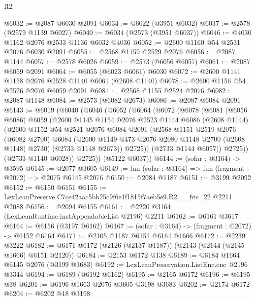 \begin{lexlean}{R2}
\begin{coremodule}
@6032 := @2087 @6030 @2091
@6034 := @6022 (@3951 @6032)
@6037 := @2578 (@2579 @1139 @6027)
@6040 := @6034 (@2573 (@3951 @6037))
@6046 := @4030 @1162 @2076 @2533 @1136 @6032 @4036
@6052 := @2600 @1160 @54 @2531 @2076 @6030 @2091
@6055 := @2568 @1159 @2529 @2076
@6056 := @2087 @1144
@6057 := @2578 @6026
@6059 := @2573 (@6056 @6057)
@6061 := @2087 @6059 @2091
@6064 := @6055 (@6023 @6061) @6030
@6072 := @2600 @1141 @1158 @2076 @2528 @1140 @6061 (@2608 @1140)
@6078 := @2600 @1156 @54 @2526 @2076 @6059 @2091
@6081 := @2568 @1155 @2524 @2076
@6082 := @2087 @1148
@6084 := @2573 (@6082 @2673)
@6086 := @2087 @6084 @2091
@6143 := @6019
    (@6040
      (@6046
        (@6052
          (@6064
            (@6072
              (@6078
                (@6081
                  (@6056 @6086)
                  @6059
                  (@2600
                    @1145
                    @1154
                    @2076
                    @2523
                    @1144
                    @6086
                    (@2608 @1144)
                    (@2600
                      @1152
                      @54
                      @2521
                      @2076
                      @6084
                      @2091
                      (@2568
                        @1151
                        @2519
                        @2076
                        (@6082 @2700)
                        @6084
                        (@2600 @1149 @473 @2076 @2080 @1148 @2700 (@2608 @1148) @2730)
                        (@2733 @1148 @2673))
                      @2725))
                  (@2733 @1144 @6057))
                @2725))
            (@2733 @1140 @6028))
          @2725))
      (@5122 @6037))
@6144 := (sofar : @3164) -> @3595
@6145 := @2077 @3605
@6149 := fun (sofar : @3164) => fun (fragment : @2072) => @2075 @6145 @2076
@6150 := @2084 @1187
@6151 := @3199 @2092
@6152 := @6150 @6151
@6155 := LexLeanPreserve.C7ce42aac5bb25c9f6e1f1815f7aeb5e9.R2.__fits_22 @2211 @2088
@6156 := @2094 @6155
@6161 := @2220 @3164 (LexLeanRuntime.instAppendableList @2196) @2211
@6162 := @6161 @3617
@6164 := @6156 (@3197 @6162)
@6167 := (sofar : @3164) -> (fragment : @2072) -> @6152 @6164
@6171 := @2105 @1187 @6151 @6164 @1666
@6172 := @2239 @3222
@6182 := @6171 @6172 (@2126 (@2137 @1187)) (@2143 (@2144 (@2145 @1666) @6151 @2120))
@6184 := @2153 @6172 @138
@6189 := @6184 @1664 @6145 @2076 (@3199 @3683)
@6192 := LexLeanPreservation.ListEnc.enc @2196 @3344
@6194 := @6189 (@6192 @6162)
@6195 := @2165 @6172
@6196 := @6195 @38
@6201 := @6196 @1663 @2076 @3605 @3198 @3683
@6202 := @2174 @6172
@6204 := @6202 @18 @3198

\end{coremodule}
\end{lexlean}

